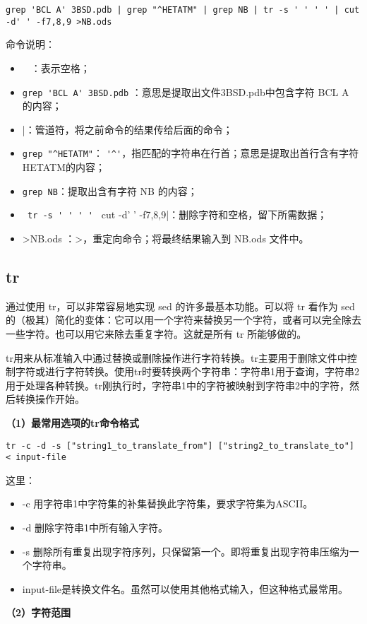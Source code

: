  \verb*[grep 'BCL A' 3BSD.pdb | grep "^HETATM" | grep NB | tr -s ' ' ' ' | cut -d' ' -f7,8,9 >NB.ods[ 

命令说明：
\begin{itemize}
\item \verb*| | ：表示空格；
\item \verb*[grep 'BCL A' 3BSD.pdb[ ：意思是提取出文件3BSD.pdb中包含字符 BCL A 的内容；
\item |：管道符，将之前命令的结果传给后面的命令；
\item \verb*[grep "^HETATM"[： \verb|'^'|，指匹配的字符串在行首；意思是提取出首行含有字符HETATM的内容；
\item \verb*|grep NB|：提取出含有字符 NB 的内容；
\item \verb*| tr -s ' ' ' ' | cut -d' ' -f7,8,9|：删除字符和空格，留下所需数据；
\item >NB.ods ：>，重定向命令；将最终结果输入到 NB.ods 文件中。
\end{itemize}




\subsection{tr}
通过使用 tr，可以非常容易地实现 sed 的许多最基本功能。可以将 tr 看作为 sed 的（极其）简化的变体：它可以用一个字符来替换另一个字符，或者可以完全除去一些字符。也可以用它来除去重复字符。这就是所有 tr 所能够做的。 


tr用来从标准输入中通过替换或删除操作进行字符转换。tr主要用于删除文件中控制字符或进行字符转换。使用tr时要转换两个字符串：字符串1用于查询，字符串2用于处理各种转换。tr刚执行时，字符串1中的字符被映射到字符串2中的字符，然后转换操作开始。

\textbf{（1）最常用选项的tr命令格式}

\verb|tr -c -d -s ["string1_to_translate_from"] ["string2_to_translate_to"] < input-file|

这里：
\begin{itemize}
\item -c 用字符串1中字符集的补集替换此字符集，要求字符集为ASCII。
\item -d 删除字符串1中所有输入字符。
\item -s 删除所有重复出现字符序列，只保留第一个。即将重复出现字符串压缩为一个字符串。
\item input-file是转换文件名。虽然可以使用其他格式输入，但这种格式最常用。
\end{itemize}

\textbf{（2）字符范围}

